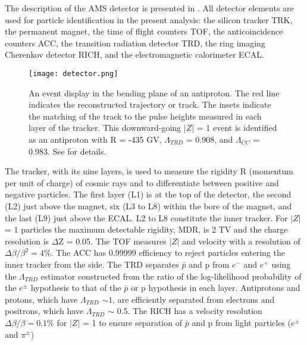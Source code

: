 \documentclass[twocolumn,twoside,slac_two]{revtex4-1}
\begin{document}
 The description of the AMS detector is
presented in \cite{ref:AMS2_first,ref:AMS2_fraction,ref:AMS2_epfluxes,ref:AMS2_allele,ref:AMS2_protons,ref:AMS2_He,ref:AMS2_pbar,ref:AMS2_BC}.
All detector elements are used for particle identification in the present analysis:
the silicon tracker TRK, the permanent magnet, the time of flight
counters TOF, the anticoincidence counters ACC,
the transition radiation detector TRD, the ring imaging
Cherenkov detector RICH, and the electromagnetic
calorimeter ECAL.
\begin{figure}[t]
\centering
\texttt{[image: detector.png]}
\caption{
  An event display in the bending plane of an antiproton. The red line indicates
  the reconstructed trajectory or track. The insets indicate the matching of the track to the pulse
  heights measured in each layer of the tracker. This downward-going $\vert Z \vert$ = 1 event is identified as
  an antiproton with R = -435 GV, $\Lambda_{TRD}$ = 0.908, and $\Lambda_{CC}$ = 0.983. See \cite{ref:AMS2_pbar} for details.
} \label{detector}
\end{figure}
The tracker, with its nine layers, is used to
measure the rigidity R (momentum per unit of charge)
of cosmic rays and to differentiate between positive and
negative particles. 
The first layer (L1)
is at the top of the detector, the second (L2) just above the
magnet, six (L3 to L8) within the bore of the magnet, and
the last (L9) just above the ECAL. L2 to L8 constitute the
inner tracker. For $\vert Z \vert$ = 1 particles the maximum detectable
rigidity, MDR, is 2 TV and the charge resolution is
$\Delta$Z = 0.05. The TOF measures $\vert Z \vert$ and velocity with a
resolution of $\Delta \beta / \beta^2  = 4\%$. The ACC has 0.99999 efficiency
to reject particles entering the inner tracker from
the side.
The TRD separates $\bar{p}$ and p from $e^-$ and $e^+$ using the
$\Lambda_{TRD}$ estimator constructed from the ratio of the log-likelihood
probability of the $e^{\pm}$ hypothesis to that of the $\bar{p}$ or p
hypothesis in each layer. Antiprotons and protons,
which have $\Lambda_{TRD}$ $\sim 1$, are efficiently separated from electrons
and positrons, which have $\Lambda_{TRD}$ $\sim$ 0.5. The RICH has a
velocity resolution $\Delta \beta / \beta = 0.1\%$ for $\vert Z \vert$ = 1 to ensure
separation of $\bar{p}$ and p from light particles ($e^{\pm}$ and $\pi^{\pm}$)
\end{document}
